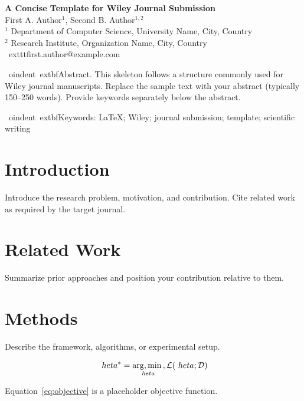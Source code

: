 \documentclass[11pt,a4paper]{article}
\DeclareMathOperator*{\argmin}{arg\\,min}
\begin{document}
\begin{center}
{\LARGE\bfseries A Concise Template for Wiley Journal Submission}\\[1.2em]
{\large First A. Author$^{1}$, Second B. Author$^{1,2}$}\\[0.6em]
{$^{1}$ Department of Computer Science, University Name, City, Country}\\
{$^{2}$ Research Institute, Organization Name, City, Country}\\[0.6em]
\	exttt{first.author@example.com}
\end{center}

\vspace{1.2em}

\
oindent\	extbf{Abstract.}
This skeleton follows a structure commonly used for Wiley journal manuscripts. Replace the sample text with your abstract (typically 150--250 words). Provide keywords separately below the abstract.

\vspace{0.8em}

\
oindent\	extbf{Keywords:} LaTeX; Wiley; journal submission; template; scientific writing

\vspace{1.2em}

\section{Introduction}
Introduce the research problem, motivation, and contribution. Cite related work as required by the target journal.

\section{Related Work}
Summarize prior approaches and position your contribution relative to them.

\section{Methods}
Describe the framework, algorithms, or experimental setup.

\begin{equation}
\	heta^{*} = \argmin_{\	heta} \\, \mathcal{L}(\	heta; \mathcal{D})
\label{eq:objective}
\end{equation}

Equation~\eqref{eq:objective} is a placeholder objective function.
\end{document}
